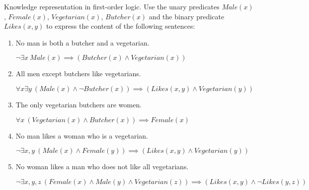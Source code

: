 \documentclass[12pt]{article}
\newenvironment{problem}[2][Problem]{\begin{trivlist}
\item[\hskip \labelsep {\bfseries #1}\hskip \labelsep {\bfseries #2.}]}{\end{trivlist}}
\begin{document}
\begin{problem}{2}
	Knowledge representation in first-order logic.
	Use the unary predicates $Male(x)$, $Female(x)$, $Vegetarian(x)$, $Butcher(x)$
	and the binary predicate $Likes(x,y)$ to express the content of the following sentences:
	\begin{enumerate}
		\item No man is both a butcher and a vegetarian.

			\vspace{0.25cm}
			$\neg \exists x ~ Male(x) \implies \left(Butcher(x) \wedge Vegetarian(x)\right)$
		\item All men except butchers like vegetarians.

			\vspace{0.25cm}
			$\forall x \exists y ~ \left( Male(x) \wedge \neg Butcher(x)\right) \implies \left( Likes(x,y) \wedge Vegetarian(y)\right)$
		\item  The only vegetarian butchers are women. 

			\vspace{0.25cm}
			$\forall x ~ \left( Vegetarian(x) \wedge Butcher(x)\right) \implies Female(x)$
		\item No man likes a woman who is a vegetarian.

			\vspace{0.25cm}
			$\neg \exists x,y ~ \left(Male(x) \wedge Female(y)\right) \implies \left(Likes(x,y) \wedge Vegetarian(y)\right)$
		\item No woman likes a man who does not like all vegetarians.

			\vspace{0.25cm}
			$\neg \exists x,y,z ~ \left(Female(x) \wedge Male(y) \wedge Vegetarian(z)\right) \implies \left(Likes(x,y) \wedge \neg Likes(y,z)\right)$
	\end{enumerate}
\end{problem}
\end{document}
